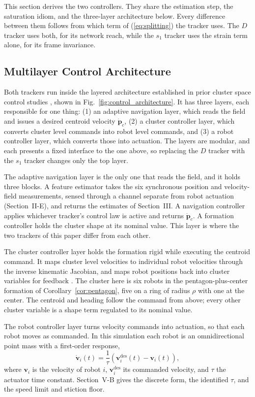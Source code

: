 \documentclass[lettersize,journal]{IEEEtran}
\begin{document}
This section derives the two controllers. They share the estimation
step, the saturation idiom, and the three-layer architecture below.
Every difference between them follows from which term of
(\ref{eq:splitting}) the tracker uses. The $D$ tracker uses both, for
its network reach, while the $s_1$ tracker uses the strain term alone,
for its frame invariance.

\subsection{Multilayer Control Architecture}
\label{sec:arch}

Both trackers run inside the layered architecture established in prior
cluster space control studies \cite{9,4,3,37}, shown in
Fig.~\ref{fig:control_architecture}. It has three layers, each
responsible for one thing: (1) an adaptive navigation layer, which
reads the field and issues a desired centroid velocity
$\dot{\mathbf{p}}_c$, (2) a cluster controller layer, which converts
cluster level commands into robot level commands, and (3) a robot
controller layer, which converts those into actuation. The layers are modular, and each
presents a fixed interface to the one above, so replacing the $D$
tracker with the $s_1$ tracker changes only the top layer.

The adaptive navigation layer is the only one that reads the field, and
it holds three blocks. A feature estimator takes the six synchronous
position and velocity-field measurements, sensed through a channel
separate from robot actuation (Section~\mbox{II-E}), and returns the
estimates of Section~\mbox{III}. A navigation controller applies
whichever tracker's control law is active and returns
$\dot{\mathbf{p}}_c$. A formation controller holds the cluster shape at
its nominal value. This layer is where the two trackers of this paper
differ from each other.

The cluster controller layer holds the formation rigid while executing the
centroid command. It maps cluster level velocities to individual robot
velocities through the inverse kinematic Jacobian, and maps robot
positions back into cluster variables for feedback \cite{37,38}. The
cluster here is six robots in the pentagon-plus-center formation of
Corollary~\ref{cor:pentagon}, five on a ring of radius $\rho$ with one
at the center. The centroid and heading follow the command from above;
every other cluster variable is a shape term regulated to its nominal
value.

The robot controller layer turns velocity commands into actuation, so that each
robot moves as commanded. In this simulation each robot is an
omnidirectional point mass with a first-order response,
\begin{equation}
    \dot{\mathbf{v}}_i(t) = \frac{1}{\tau}\left(
    \mathbf{v}_i^{\text{des}}(t) - \mathbf{v}_i(t)\right),
    \label{eq:robot_first_order}
\end{equation}
where $\mathbf{v}_i$ is the velocity of robot $i$,
$\mathbf{v}_i^{\text{des}}$ its commanded velocity, and $\tau$ the
actuator time constant. Section~\mbox{V-B} gives the discrete form, the
identified $\tau$, and the speed limit and stiction floor.
\end{document}
